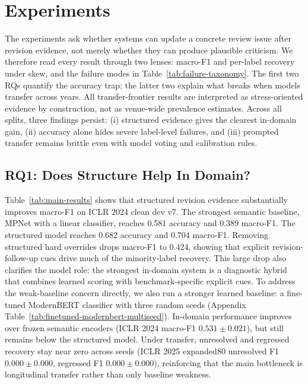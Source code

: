 \section{Experiments}

The experiments ask whether systems can update a concrete review issue after revision evidence, not merely whether they can produce plausible criticism.
We therefore read every result through two lenses: macro-F1 and per-label recovery under skew, and the failure modes in Table~\ref{tab:failure-taxonomy}.
The first two RQs quantify the accuracy trap; the latter two explain what breaks when models transfer across years.
All transfer-frontier results are interpreted as stress-oriented evidence by construction, not as venue-wide prevalence estimates.
Across all splits, three findings persist: (i) structured evidence gives the clearest in-domain gain, (ii) accuracy alone hides severe label-level failures, and (iii) prompted transfer remains brittle even with model voting and calibration rules.

\subsection{RQ1: Does Structure Help In Domain?}



Table~\ref{tab:main-results} shows that structured revision evidence substantially improves macro-F1 on ICLR 2024 clean dev v7.
The strongest semantic baseline, MPNet with a linear classifier, reaches 0.581 accuracy and 0.389 macro-F1.
The structured model reaches 0.682 accuracy and 0.704 macro-F1.
Removing structured hard overrides drops macro-F1 to 0.424, showing that explicit revision-follow-up cues drive much of the minority-label recovery.
This large drop also clarifies the model role: the strongest in-domain system is a diagnostic hybrid that combines learned scoring with benchmark-specific explicit cues.
To address the weak-baseline concern directly, we also run a stronger learned baseline: a fine-tuned ModernBERT classifier with three random seeds (Appendix Table~\ref{tab:finetuned-modernbert-multiseed}).
In-domain performance improves over frozen semantic encoders (ICLR 2024 macro-F1 $0.531\pm0.021$), but still remains below the structured model.
Under transfer, unresolved and regressed recovery stay near zero across seeds (ICLR 2025 expanded80 unresolved F1 $0.000\pm0.000$, regressed F1 $0.000\pm0.000$), reinforcing that the main bottleneck is longitudinal transfer rather than only baseline weakness.

